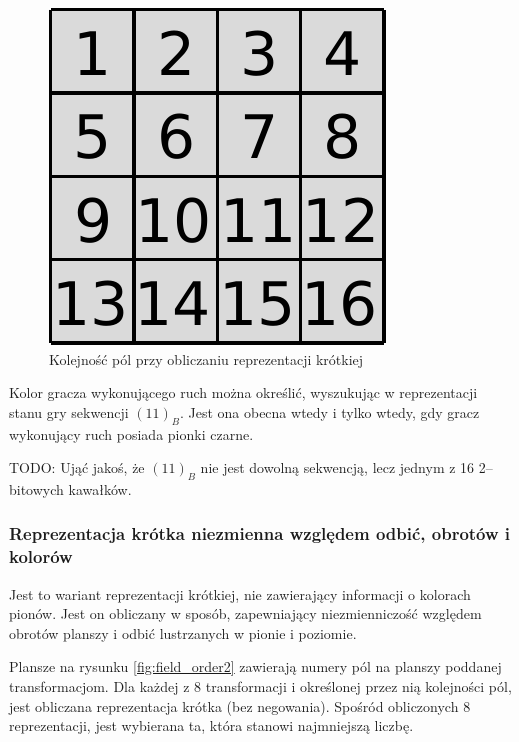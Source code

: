 \documentclass{scrartcl}
\begin{document}
\begin{figure}
  \centering
  \includegraphics{data/field_order.pdf}
  \caption{Kolejność pól przy obliczaniu reprezentacji krótkiej}
  \label{fig:field_order}
\end{figure}

Kolor gracza wykonującego ruch można określić, wyszukując w
reprezentacji stanu gry sekwencji $(11)_B$. Jest ona obecna wtedy i
tylko wtedy, gdy gracz wykonujący ruch posiada pionki czarne.

TODO: Ująć jakoś, że $(11)_B$ nie jest dowolną sekwencją, lecz jednym
z 16 2--bitowych kawałków.

\subsubsection{Reprezentacja krótka niezmienna względem odbić,
  obrotów i kolorów}
Jest to wariant reprezentacji krótkiej, nie zawierający informacji 
o kolorach pionów. Jest on obliczany w sposób, zapewniający 
niezmienniczość względem obrotów planszy i odbić lustrzanych w pionie
i poziomie. 

Plansze na rysunku \ref{fig:field_order2} zawierają numery pól na
planszy poddanej transformacjom. Dla każdej z 8 transformacji i
określonej przez nią kolejności pól, jest obliczana reprezentacja 
krótka (bez negowania). Spośród obliczonych 8 reprezentacji, 
jest wybierana ta, która stanowi najmniejszą liczbę.
\end{document}
